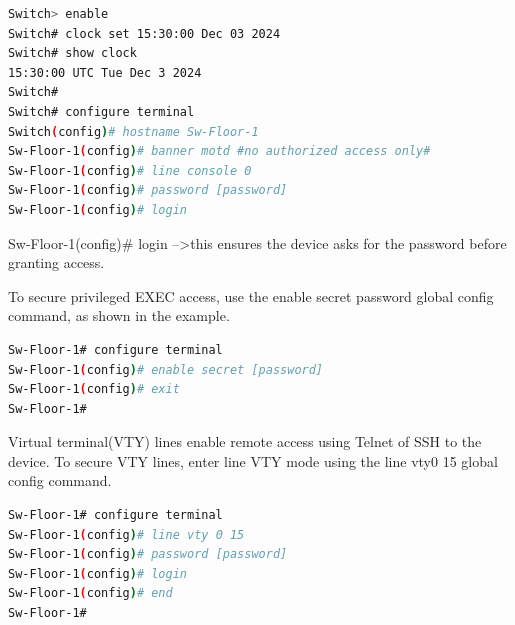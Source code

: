 \documentclass[a4paper,11pt]{article}
\begin{document}
\begin{tcolorbox}[colframe=blue!80, colback=blue!20, coltitle=black, title= Scenario: Basic Configuration]
\begin{lstlisting}[language=bash, caption={Configuration on a Cisco Device}]
Switch> enable
Switch# clock set 15:30:00 Dec 03 2024
Switch# show clock
15:30:00 UTC Tue Dec 3 2024
Switch# 
Switch# configure terminal
Switch(config)# hostname Sw-Floor-1
Sw-Floor-1(config)# banner motd #no authorized access only# 
Sw-Floor-1(config)# line console 0
Sw-Floor-1(config)# password [password]
Sw-Floor-1(config)# login    
\end{lstlisting}
Sw-Floor-1(config)# login   -->this ensures the device asks for the password before granting access.\\
\end{tcolorbox}

\begin{tcolorbox}[colframe=blue!80, colback=blue!20, coltitle=black, title= Scenario: Securing User EXEC mode (Console Access)]
 To secure privileged EXEC access, use the enable secret password global config command, as shown in the example.\\
\begin{lstlisting}[language=bash, caption={Configuration on a Cisco Device}]
Sw-Floor-1# configure terminal
Sw-Floor-1(config)# enable secret [password]
Sw-Floor-1(config)# exit
Sw-Floor-1#
\end{lstlisting}
\end{tcolorbox}



\begin{tcolorbox}[colframe=blue!80, colback=blue!20, coltitle=black, title= Scenario: Securing Using Telnet SSH]
  Virtual terminal(VTY) lines enable remote access using Telnet of SSH to the device. To secure VTY lines, enter line VTY mode using the line vty0 15 global config command.\\
\begin{lstlisting}[language=bash, caption={Configuration on a Cisco Device}]
Sw-Floor-1# configure terminal
Sw-Floor-1(config)# line vty 0 15
Sw-Floor-1(config)# password [password]
Sw-Floor-1(config)# login
Sw-Floor-1(config)# end
Sw-Floor-1#
\end{lstlisting}
\end{tcolorbox}
\end{document}
